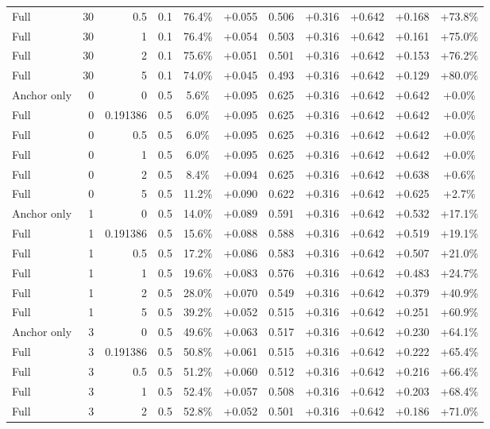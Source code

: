 \begin{table}[htbp]
\begin{tabular}{lrrrccccccc}
Full & 30 & 0.5 & 0.1 & 76.4\% & +0.055 & 0.506 & +0.316 & +0.642 & +0.168 & +73.8\% \\
Full & 30 & 1 & 0.1 & 76.4\% & +0.054 & 0.503 & +0.316 & +0.642 & +0.161 & +75.0\% \\
Full & 30 & 2 & 0.1 & 75.6\% & +0.051 & 0.501 & +0.316 & +0.642 & +0.153 & +76.2\% \\
Full & 30 & 5 & 0.1 & 74.0\% & +0.045 & 0.493 & +0.316 & +0.642 & +0.129 & +80.0\% \\
Anchor only & 0 & 0 & 0.5 & 5.6\% & +0.095 & 0.625 & +0.316 & +0.642 & +0.642 & +0.0\% \\
Full & 0 & 0.191386 & 0.5 & 6.0\% & +0.095 & 0.625 & +0.316 & +0.642 & +0.642 & +0.0\% \\
Full & 0 & 0.5 & 0.5 & 6.0\% & +0.095 & 0.625 & +0.316 & +0.642 & +0.642 & +0.0\% \\
Full & 0 & 1 & 0.5 & 6.0\% & +0.095 & 0.625 & +0.316 & +0.642 & +0.642 & +0.0\% \\
Full & 0 & 2 & 0.5 & 8.4\% & +0.094 & 0.625 & +0.316 & +0.642 & +0.638 & +0.6\% \\
Full & 0 & 5 & 0.5 & 11.2\% & +0.090 & 0.622 & +0.316 & +0.642 & +0.625 & +2.7\% \\
Anchor only & 1 & 0 & 0.5 & 14.0\% & +0.089 & 0.591 & +0.316 & +0.642 & +0.532 & +17.1\% \\
Full & 1 & 0.191386 & 0.5 & 15.6\% & +0.088 & 0.588 & +0.316 & +0.642 & +0.519 & +19.1\% \\
Full & 1 & 0.5 & 0.5 & 17.2\% & +0.086 & 0.583 & +0.316 & +0.642 & +0.507 & +21.0\% \\
Full & 1 & 1 & 0.5 & 19.6\% & +0.083 & 0.576 & +0.316 & +0.642 & +0.483 & +24.7\% \\
Full & 1 & 2 & 0.5 & 28.0\% & +0.070 & 0.549 & +0.316 & +0.642 & +0.379 & +40.9\% \\
Full & 1 & 5 & 0.5 & 39.2\% & +0.052 & 0.515 & +0.316 & +0.642 & +0.251 & +60.9\% \\
Anchor only & 3 & 0 & 0.5 & 49.6\% & +0.063 & 0.517 & +0.316 & +0.642 & +0.230 & +64.1\% \\
Full & 3 & 0.191386 & 0.5 & 50.8\% & +0.061 & 0.515 & +0.316 & +0.642 & +0.222 & +65.4\% \\
Full & 3 & 0.5 & 0.5 & 51.2\% & +0.060 & 0.512 & +0.316 & +0.642 & +0.216 & +66.4\% \\
Full & 3 & 1 & 0.5 & 52.4\% & +0.057 & 0.508 & +0.316 & +0.642 & +0.203 & +68.4\% \\
Full & 3 & 2 & 0.5 & 52.8\% & +0.052 & 0.501 & +0.316 & +0.642 & +0.186 & +71.0\% \\

\end{tabular}
\end{table}
